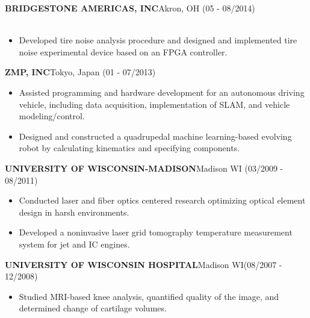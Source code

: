\documentclass[11pt,letterpaper]{article}
\begin{document}
  \MakeUppercase{\bf Bridgestone Americas, Inc}\hfill{Akron, OH}{ (05 - 08/2014)}\\
  \\
  \begin{itemize}
  \item Developed tire noise analysis procedure and designed and implemented tire noise experimental device based on an FPGA controller.
  \end{itemize}

  \MakeUppercase{\bf ZMP, Inc}\hfill{Tokyo, Japan }{(01 - 07/2013)}\\
  \begin{itemize}
  \item Assisted programming and hardware development for an autonomous driving vehicle, including data acquisition, implementation of SLAM, and vehicle modeling/control.
  \item Designed and constructed a quadrupedal machine learning-based evolving robot by calculating kinematics and specifying components.
  \end{itemize}

  \MakeUppercase{\bf University of Wisconsin-Madison}\hfill{Madison WI}{ (03/2009 - 08/2011)}\\
  \begin{itemize}
  \item Conducted laser and fiber optics centered research optimizing optical element design in harsh environments.
  \item Developed a noninvasive laser grid tomography temperature measurement system for jet and IC engines.
  \end{itemize}

  \MakeUppercase{\bf University of Wisconsin Hospital}\hfill{Madison WI}{ {(08/2007 - 12/2008)}}\\
  \begin{itemize}
  \item Studied MRI-based knee analysis, quantified quality of the image, and determined change of cartilage volumes.
  \end{itemize}
\end{document}
